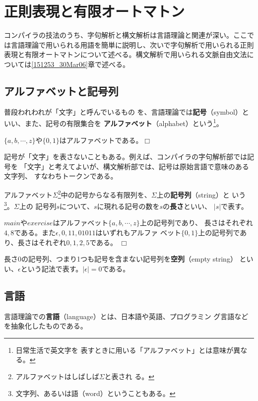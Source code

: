 
\chapter{正則表現と有限オートマトン}
\label{175712_30Mar06}

コンパイラの技法のうち、字句解析と構文解析は言語理論と関連が深い。ここで
は言語理論で用いられる用語を簡単に説明し、次いで字句解析で用いられる正則
表現と有限オートマトンについて述べる。構文解析で用いられる文脈自由文法に
ついては\ref{151253_30Mar06}章で述べる。

\section{アルファベットと記号列}

普段われわれが「文字」と呼んでいるもの
を、言語理論では{\bfseries 記号}（symbol）といい、また、記号の有限集合を
{\bf アルファベット}（alphabet）という\footnote{日常生活で英文字を
表すときに用いる「アルファベット」とは意味が異なる。}。
\begin{example}
 $\{a, b, \cdots, z\}$や$\{0, 1\}$はアルファベットである。$\Box$
\end{example}
記号が「文字」を表さないこともある。例えば、コンパイラの字句解析部では記号を
「文字」と考えてよいが、構文解析部では、記号は原始言語で意味のある文字列、
すなわちトークンである。

アルファベット$\Sigma$\footnote{アルファベットはしばしば$\Sigma$と表され
る。}中の記号からなる有限列を、$\Sigma$上の{\bf 記号列}（string）と
いう\footnote{文字列、あるいは語（word）ということもある。}。$\Sigma$上の
記号列$s$について、$s$に現れる記号の数を$s$の{\bf 長さ}といい、
$|s|$で表す。

\begin{example}
 $main$や$exercise$はアルファベット$\{a, b, \cdots, z\}$上の記号列であり、
 長さはそれぞれ$4, 8$である。また$\epsilon, 0, 11, 01011$はいずれもアルファ
 ベット$\{0, 1\}$上の記号列であり、長さはそれぞれ$0, 1, 2, 5$である。
 $\Box$
\end{example}

長さ0の記号列、つまり1つも記号を含まない記号列を{\bf 空列}（empty string）
といい、$\epsilon$という記法で表す。$|\epsilon| = 0$である。

\section{言語}

言語理論での{\bf 言語}（language）とは、日本語や英語、プログラミン
グ言語などを抽象化したものである。


